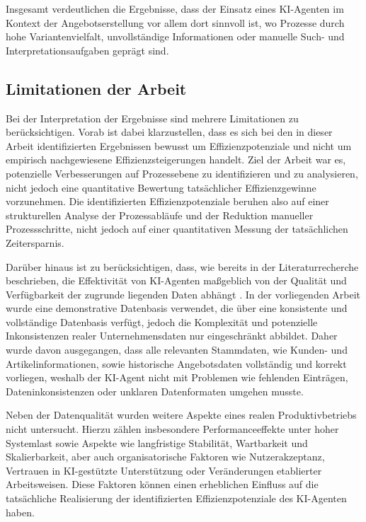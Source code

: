Insgesamt verdeutlichen die Ergebnisse, dass der Einsatz eines \ac{KI}-Agenten im Kontext der Angebotserstellung vor allem dort sinnvoll ist, wo Prozesse durch hohe Variantenvielfalt, unvollständige Informationen oder manuelle Such- und Interpretationsaufgaben geprägt sind.

\subsection{Limitationen der Arbeit}

Bei der Interpretation der Ergebnisse sind mehrere Limitationen zu berücksichtigen. Vorab ist dabei klarzustellen, dass es sich bei den in dieser Arbeit identifizierten Ergebnissen bewusst um Effizienzpotenziale und nicht um empirisch nachgewiesene Effizienzsteigerungen handelt. Ziel der Arbeit war es, potenzielle Verbesserungen auf Prozessebene zu identifizieren und zu analysieren, nicht jedoch eine quantitative Bewertung tatsächlicher Effizienzgewinne vorzunehmen. Die identifizierten Effizienzpotenziale beruhen also auf einer strukturellen Analyse der Prozessabläufe und der Reduktion manueller Prozessschritte, nicht jedoch auf einer quantitativen Messung der tatsächlichen Zeitersparnis.

Darüber hinaus ist zu berücksichtigen, dass, wie bereits in der Literaturrecherche beschrieben, die Effektivität von \ac{KI}-Agenten maßgeblich von der Qualität und Verfügbarkeit der zugrunde liegenden Daten abhängt \cite[]{gujar_role_2025}. In der vorliegenden Arbeit wurde eine demonstrative Datenbasis verwendet, die über eine konsistente und vollständige Datenbasis verfügt, jedoch die Komplexität und potenzielle Inkonsistenzen realer Unternehmensdaten nur eingeschränkt abbildet. Daher wurde davon ausgegangen, dass alle relevanten Stammdaten, wie Kunden- und Artikelinformationen, sowie historische Angebotsdaten vollständig und korrekt vorliegen, weshalb der \ac{KI}-Agent nicht mit Problemen wie fehlenden Einträgen, Dateninkonsistenzen oder unklaren Datenformaten umgehen musste.

Neben der Datenqualität wurden weitere Aspekte eines realen Produktivbetriebs nicht untersucht. Hierzu zählen insbesondere Performanceeffekte unter hoher Systemlast sowie Aspekte wie langfristige Stabilität, Wartbarkeit und Skalierbarkeit, aber auch organisatorische Faktoren wie Nutzerakzeptanz, Vertrauen in \ac{KI}-gestützte Unterstützung oder Veränderungen etablierter Arbeitsweisen. Diese Faktoren können einen erheblichen Einfluss auf die tatsächliche Realisierung der identifizierten Effizienzpotenziale des \ac{KI}-Agenten haben.

